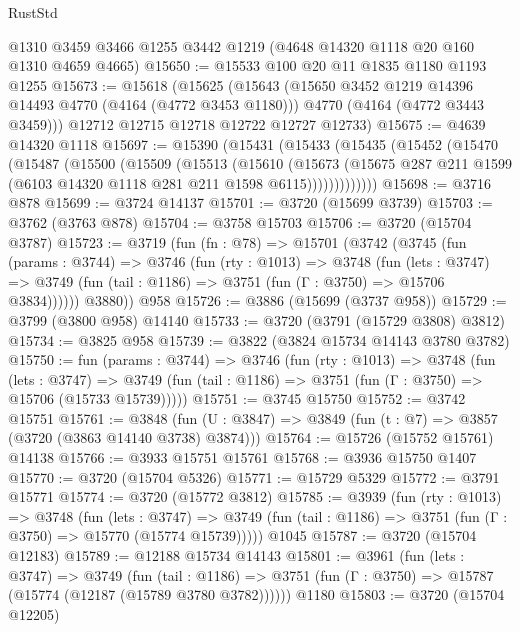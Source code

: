 \begin{lexlean}{RustStd}
\begin{coremodule}
    @1310
    @3459
    @3466
    @1255
    @3442
    @1219
    (@4648 @14320 @1118 @20 @160 @1310 @4659 @4665)
@15650 := @15533 @100 @20 @11 @1835 @1180 @1193 @1255
@15673 := @15618
    (@15625
      (@15643
        (@15650 @3452 @1219 @14396 @14493 @4770 (@4164 (@4772 @3453 @1180)))
        @4770
        (@4164 (@4772 @3443 @3459)))
      @12712
      @12715
      @12718
      @12722
      @12727
      @12733)
@15675 := @4639 @14320 @1118
@15697 := @15390
    (@15431
      (@15433
        (@15435
          (@15452
            (@15470
              (@15487
                (@15500
                  (@15509
                    (@15513
                      (@15610
                        (@15673
                          (@15675
                            @287
                            @211
                            @1599
                            (@6103 @14320 @1118 @281 @211 @1598 @6115)))))))))))))
@15698 := @3716 @878
@15699 := @3724 @14137
@15701 := @3720 (@15699 @3739)
@15703 := @3762 (@3763 @878)
@15704 := @3758 @15703
@15706 := @3720 (@15704 @3787)
@15723 := @3719
    (fun (fn : @78) =>
    @15701
      (@3742
        (@3745
          (fun (params : @3744) =>
          @3746
            (fun (rty : @1013) =>
            @3748
              (fun (lets : @3747) =>
              @3749 (fun (tail : @1186) => @3751 (fun (Γ : @3750) => @15706 @3834))))))
        @3880))
    @958
@15726 := @3886 (@15699 (@3737 @958))
@15729 := @3799 (@3800 @958) @14140
@15733 := @3720 (@3791 (@15729 @3808) @3812)
@15734 := @3825 @958
@15739 := @3822 (@3824 @15734 @14143 @3780 @3782)
@15750 := fun (params : @3744) =>
  @3746
    (fun (rty : @1013) =>
    @3748
      (fun (lets : @3747) =>
      @3749 (fun (tail : @1186) => @3751 (fun (Γ : @3750) => @15706 (@15733 @15739)))))
@15751 := @3745 @15750
@15752 := @3742 @15751
@15761 := @3848
    (fun (U : @3847) => @3849 (fun (t : @7) => @3857 (@3720 (@3863 @14140 @3738) @3874)))
@15764 := @15726 (@15752 @15761) @14138
@15766 := @3933 @15751 @15761
@15768 := @3936 @15750 @1407
@15770 := @3720 (@15704 @5326)
@15771 := @15729 @5329
@15772 := @3791 @15771
@15774 := @3720 (@15772 @3812)
@15785 := @3939
    (fun (rty : @1013) =>
    @3748
      (fun (lets : @3747) =>
      @3749 (fun (tail : @1186) => @3751 (fun (Γ : @3750) => @15770 (@15774 @15739)))))
    @1045
@15787 := @3720 (@15704 @12183)
@15789 := @12188 @15734 @14143
@15801 := @3961
    (fun (lets : @3747) =>
    @3749
      (fun (tail : @1186) =>
      @3751 (fun (Γ : @3750) => @15787 (@15774 (@12187 (@15789 @3780 @3782))))))
    @1180
@15803 := @3720 (@15704 @12205)

\end{coremodule}
\end{lexlean}
